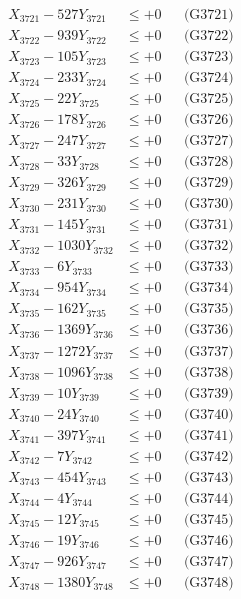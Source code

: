 \documentclass[a4paper,10pt]{article}
\begin{document}
{\begin{align}
\allowbreak
X_{3721} - 527Y_{3721} &\leq +0 && \text{(G3721)} \\
X_{3722} - 939Y_{3722} &\leq +0 && \text{(G3722)} \\
X_{3723} - 105Y_{3723} &\leq +0 && \text{(G3723)} \\
X_{3724} - 233Y_{3724} &\leq +0 && \text{(G3724)} \\
X_{3725} - 22Y_{3725} &\leq +0 && \text{(G3725)} \\
X_{3726} - 178Y_{3726} &\leq +0 && \text{(G3726)} \\
X_{3727} - 247Y_{3727} &\leq +0 && \text{(G3727)} \\
X_{3728} - 33Y_{3728} &\leq +0 && \text{(G3728)} \\
X_{3729} - 326Y_{3729} &\leq +0 && \text{(G3729)} \\
X_{3730} - 231Y_{3730} &\leq +0 && \text{(G3730)} \\
\allowbreak
X_{3731} - 145Y_{3731} &\leq +0 && \text{(G3731)} \\
X_{3732} - 1030Y_{3732} &\leq +0 && \text{(G3732)} \\
X_{3733} - 6Y_{3733} &\leq +0 && \text{(G3733)} \\
X_{3734} - 954Y_{3734} &\leq +0 && \text{(G3734)} \\
X_{3735} - 162Y_{3735} &\leq +0 && \text{(G3735)} \\
X_{3736} - 1369Y_{3736} &\leq +0 && \text{(G3736)} \\
X_{3737} - 1272Y_{3737} &\leq +0 && \text{(G3737)} \\
X_{3738} - 1096Y_{3738} &\leq +0 && \text{(G3738)} \\
X_{3739} - 10Y_{3739} &\leq +0 && \text{(G3739)} \\
X_{3740} - 24Y_{3740} &\leq +0 && \text{(G3740)} \\
\allowbreak
X_{3741} - 397Y_{3741} &\leq +0 && \text{(G3741)} \\
X_{3742} - 7Y_{3742} &\leq +0 && \text{(G3742)} \\
X_{3743} - 454Y_{3743} &\leq +0 && \text{(G3743)} \\
X_{3744} - 4Y_{3744} &\leq +0 && \text{(G3744)} \\
X_{3745} - 12Y_{3745} &\leq +0 && \text{(G3745)} \\
X_{3746} - 19Y_{3746} &\leq +0 && \text{(G3746)} \\
X_{3747} - 926Y_{3747} &\leq +0 && \text{(G3747)} \\
X_{3748} - 1380Y_{3748} &\leq +0 && \text{(G3748)} \\

\end{align}}
\end{document}
